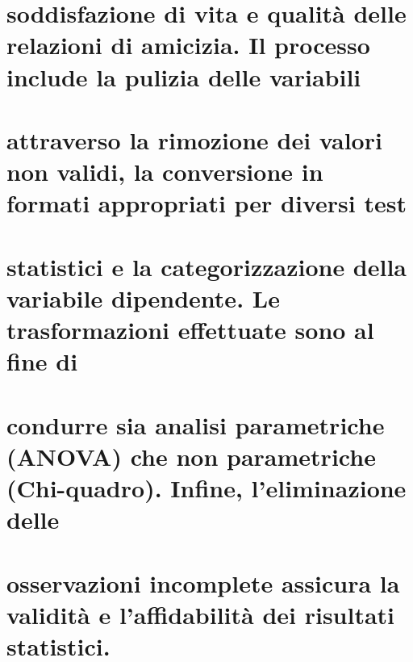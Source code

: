 \documentclass[
]{article}
\begin{document}
\section{soddisfazione di vita e qualità delle relazioni di amicizia. Il
processo include la pulizia delle
variabili}\label{soddisfazione-di-vita-e-qualituxe0-delle-relazioni-di-amicizia.-il-processo-include-la-pulizia-delle-variabili}

\section{attraverso la rimozione dei valori non validi, la conversione
in formati appropriati per diversi
test}\label{attraverso-la-rimozione-dei-valori-non-validi-la-conversione-in-formati-appropriati-per-diversi-test}

\section{statistici e la categorizzazione della variabile dipendente. Le
trasformazioni effettuate sono al fine
di}\label{statistici-e-la-categorizzazione-della-variabile-dipendente.-le-trasformazioni-effettuate-sono-al-fine-di}

\section{condurre sia analisi parametriche (ANOVA) che non parametriche
(Chi-quadro). Infine, l'eliminazione
delle}\label{condurre-sia-analisi-parametriche-anova-che-non-parametriche-chi-quadro.-infine-leliminazione-delle}

\section{osservazioni incomplete assicura la validità e l'affidabilità
dei risultati
statistici.}\label{osservazioni-incomplete-assicura-la-validituxe0-e-laffidabilituxe0-dei-risultati-statistici.}
\end{document}
